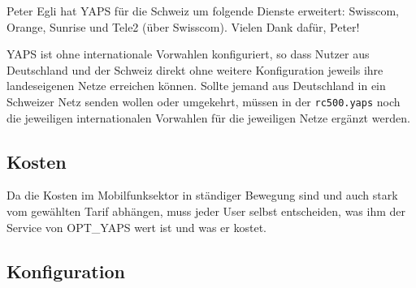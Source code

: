 Peter Egli hat YAPS für die Schweiz um folgende Dienste erweitert: Swisscom,
Orange, Sunrise und Tele2 (über Swisscom). Vielen Dank dafür, Peter!

YAPS ist ohne internationale Vorwahlen konfiguriert, so dass Nutzer aus
Deutschland und der Schweiz direkt ohne weitere Konfiguration jeweils ihre
landeseigenen Netze erreichen können. Sollte jemand aus Deutschland in ein
Schweizer Netz senden wollen oder umgekehrt, müssen in der \texttt{rc500.yaps}
noch die jeweiligen internationalen Vorwahlen für die jeweiligen Netze ergänzt
werden.

\subsection {Kosten}

Da die Kosten im Mobilfunksektor in ständiger Bewegung sind und auch stark vom
gewählten Tarif abhängen, muss jeder User selbst entscheiden, was ihm der Service
von OPT\_YAPS wert ist und was er kostet.



\subsection {Konfiguration}

